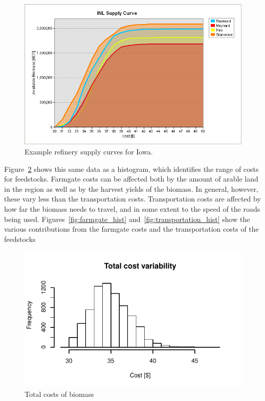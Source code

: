 \documentclass{elsart}
\begin{document}
\begin{figure}[hpt]
  \centering
  \includegraphics[width=1.0\textwidth]{inlsupplycurve2.png}  
  \caption{Example refinery supply curves for Iowa. }
  \label{fig:supply_curves}
\end{figure}

Figure~\ref{fig:supply_curves_hist} shows this same data as a
histogram, which identifies the range of costs for feedstocks.
Farmgate costs can be affected both by the amount of arable land in
the region as well as by the harvest yields of the biomass.  In
general, however, these vary less than the transportation costs.
Transportation costs are affected by how far the biomass needs to
travel, and in some extent to the speed of the roads being used.
Figures~\ref{fig:farmgate_hist} and~\ref{fig:transportation_hist} show
the various contributions from the farmgate costs and the
transportation costs of the feedstocks

\begin{figure}[hpt]
  \centering
\includegraphics[width=1.0\textwidth]{total.pdf}
  \caption{Total costs  of biomass }
  \label{fig:supply_curves_hist}
\end{figure}
\end{document}
